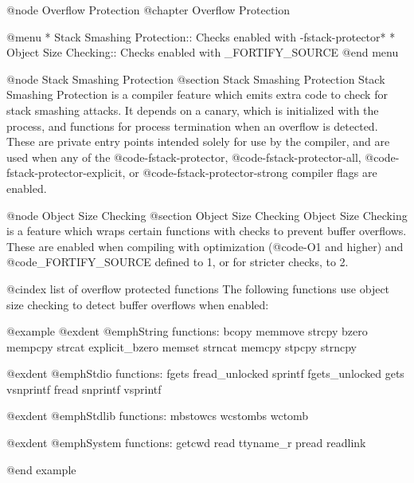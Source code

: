@node Overflow Protection
@chapter Overflow Protection

@menu
* Stack Smashing Protection::    Checks enabled with -fstack-protector*
* Object Size Checking::         Checks enabled with _FORTIFY_SOURCE
@end menu

@node Stack Smashing Protection
@section Stack Smashing Protection
Stack Smashing Protection is a compiler feature which emits extra code
to check for stack smashing attacks.  It depends on a canary, which is
initialized with the process, and functions for process termination when
an overflow is detected.  These are private entry points intended solely
for use by the compiler, and are used when any of the @code{-fstack-protector},
@code{-fstack-protector-all}, @code{-fstack-protector-explicit}, or
@code{-fstack-protector-strong} compiler flags are enabled.

@node Object Size Checking
@section Object Size Checking
Object Size Checking is a feature which wraps certain functions with checks
to prevent buffer overflows.  These are enabled when compiling with
optimization (@code{-O1} and higher) and @code{_FORTIFY_SOURCE} defined
to 1, or for stricter checks, to 2.

@cindex list of overflow protected functions
The following functions use object size checking to detect buffer overflows
when enabled:

@example
@exdent @emph{String functions:}
bcopy           memmove         strcpy
bzero           mempcpy         strcat
explicit_bzero  memset          strncat
memcpy          stpcpy          strncpy

@exdent @emph{Stdio functions:}
fgets           fread_unlocked  sprintf
fgets_unlocked  gets            vsnprintf
fread           snprintf        vsprintf

@exdent @emph{Stdlib functions:}
mbstowcs        wcstombs        wctomb

@exdent @emph{System functions:}
getcwd          read            ttyname_r
pread           readlink

@end example

